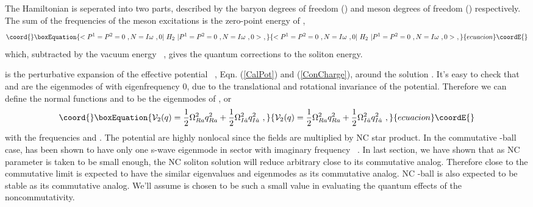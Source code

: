 \documentclass[a4paper,a4paper]{article}
\def\da{{\dot{a}}}
\begin{document}
The Hamiltonian is seperated into two parts, described by the baryon 
degrees of freedom (\coordHE{}) and meson degrees of freedom (\coordHE{}) respectively. 
The sum of the frequencies of the meson excitations is the zero-point energy of 
\coordHE{}, 
\begin{equation}\coord{}\boxEquation{
   <P^1=P^2=0\ ,N=I\omega\ ,0|~H_2~|P^1=P^2=0\ ,N=I\omega\ ,0>\ ,                                    \label{ZeroPoint}
}{
   <P^1=P^2=0\ ,N=I\omega\ ,0|~H_2~|P^1=P^2=0\ ,N=I\omega\ ,0>\ ,                                    }{ecuacion}\coordE{}\end{equation}
which, subtracted by the vacuum energy 
\coordHE{}\ , gives the quantum corrections 
to the soliton energy. 

\coordHE{} is the perturbative expansion of the effective potential 
\coordHE{}\ , Eqn. (\ref{CalPot}) and (\ref{ConCharge}), 
around the solution \myHighlight{$\sigma$}\coordHE{} . 
It's easy to check that \coordHE{} and \coordHE{} are the eigenmodes of 
\coordHE{} with eigenfrequency 0, due to the translational and rotational 
invariance of the potential. Therefore we can 
define the normal functions \coordHE{} and \myHighlight{$g_\da$}\coordHE{} to be the eigenmodes of \coordHE{} , or  
\begin{equation}\coord{}\boxEquation{
  {\cal V}_2(q)=\frac 12\Omega_{Ra}^2q_{Ra}^2+\frac 12\Omega_{I\da}^2q_{I\da}^2\ , 
}{
  {\cal V}_2(q)=\frac 12\Omega_{Ra}^2q_{Ra}^2+\frac 12\Omega_{I\da}^2q_{I\da}^2\ , 
}{ecuacion}\coordE{}\end{equation}
with the frequencies \coordHE{} and \myHighlight{$\Omega_{I\da}$}\coordHE{} . The potential \coordHE{} 
are highly nonlocal since the fields are multiplied by NC star product. 
In the commutative \coordHE{}-ball case, \coordHE{} has been shown to have only one s-wave 
eigenmode in \coordHE{} sector with imaginary frequency \coordHE{}~\cite{LeeReport}. 
In last section, we have shown that as NC parameter \myHighlight{$\theta$}\coordHE{} is taken to be small enough, 
the NC soliton solution will reduce arbitrary close to its commutative analog. 
Therefore close to the commutative limit \coordHE{} is 
expected to have the similar eigenvalues and eigenmodes as its commutative 
analog. NC \coordHE{}-ball is also expected to be stable as its commutative analog. 
We'll assume \myHighlight{$\theta$}\coordHE{} is chosen to be such a small value in evaluating 
the quantum effects of the noncommutativity. 
\end{document}
